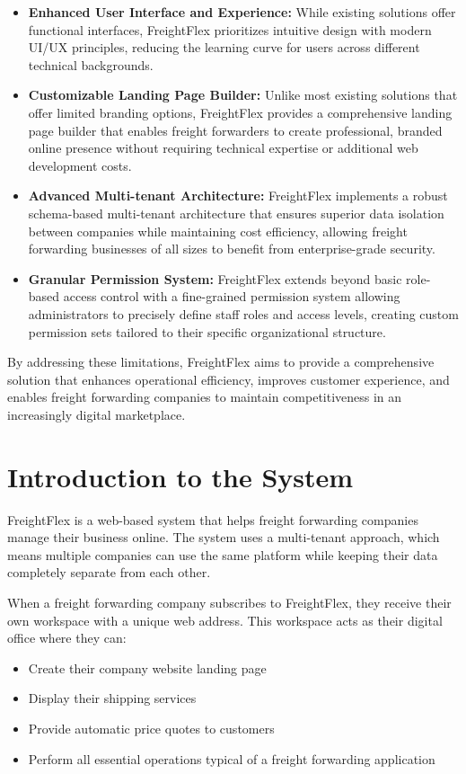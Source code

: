 \begin{itemize}
    \item \textbf{Enhanced User Interface and Experience:} While existing solutions offer functional interfaces, FreightFlex prioritizes intuitive design with modern UI/UX principles, reducing the learning curve for users across different technical backgrounds.
    
    \item \textbf{Customizable Landing Page Builder:} Unlike most existing solutions that offer limited branding options, FreightFlex provides a comprehensive landing page builder that enables freight forwarders to create professional, branded online presence without requiring technical expertise or additional web development costs.
    
    \item \textbf{Advanced Multi-tenant Architecture:} FreightFlex implements a robust schema-based multi-tenant architecture that ensures superior data isolation between companies while maintaining cost efficiency, allowing freight forwarding businesses of all sizes to benefit from enterprise-grade security.
    
    \item \textbf{Granular Permission System:} FreightFlex extends beyond basic role-based access control with a fine-grained permission system allowing administrators to precisely define staff roles and access levels, creating custom permission sets tailored to their specific organizational structure.
\end{itemize}

By addressing these limitations, FreightFlex aims to provide a comprehensive solution that enhances operational efficiency, improves customer experience, and enables freight forwarding companies to maintain competitiveness in an increasingly digital marketplace.
\section{Introduction to the System}
FreightFlex is a web-based system that helps freight forwarding companies manage their business online. The system uses a multi-tenant approach, which means multiple companies can use the same platform while keeping their data completely separate from each other.

When a freight forwarding company subscribes to FreightFlex, they receive their own workspace with a unique web address. This workspace acts as their digital office where they can:
\begin{itemize}
    \item Create their company website landing page
    \item Display their shipping services
    \item Provide automatic price quotes to customers
    \item Perform all essential operations typical of a freight forwarding application
\end{itemize}
